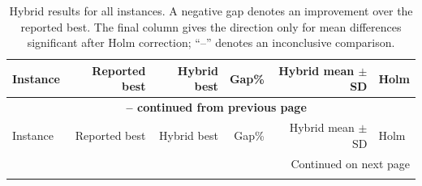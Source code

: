 \documentclass[11pt]{article}
\begin{document}
\begingroup
\footnotesize
\begin{longtable}{lrrrrl}
\caption{Hybrid results for all instances. A negative gap denotes an
improvement over the reported best. The final column gives the direction only
for mean differences significant after Holm correction; ``--'' denotes an
inconclusive comparison.} \label{tab:hybrid-comparison} \\
\hline
Instance & Reported best & Hybrid best & Gap\% & Hybrid mean $\pm$ SD & Holm \\
\hline
\endfirsthead

\multicolumn{6}{c}{{\bfseries \tablename\ \thetable{} -- continued from previous page}} \\
\hline
Instance & Reported best & Hybrid best & Gap\% & Hybrid mean $\pm$ SD & Holm \\
\hline
\endhead

\hline \multicolumn{6}{r}{{Continued on next page}} \\
\endfoot


\end{longtable}
\end{document}
